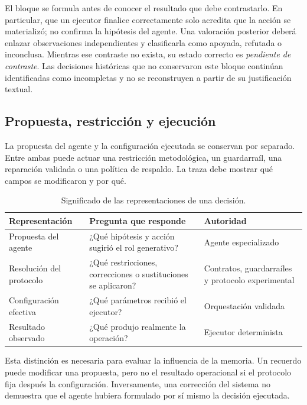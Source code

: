 El bloque se formula antes de conocer el resultado que debe contrastarlo. En
particular, que un ejecutor finalice correctamente solo acredita que la acción
se materializó; no confirma la hipótesis del agente. Una valoración posterior
deberá enlazar observaciones independientes y clasificarla como apoyada,
refutada o inconclusa. Mientras ese contraste no exista, su estado correcto es
\emph{pendiente de contraste}. Las decisiones históricas que no conservaron
este bloque continúan identificadas como incompletas y no se reconstruyen a
partir de su justificación textual.

\subsection{Propuesta, restricción y ejecución}

La propuesta del agente y la configuración ejecutada se conservan por
separado. Entre ambas puede actuar una restricción metodológica, un
guardarraíl, una reparación validada o una política de respaldo. La traza debe
mostrar qué campos se modificaron y por qué.

\begin{table}[htbp]
\centering
\caption{Significado de las representaciones de una decisión.}%
\label{tab:representaciones_decision}
\small
\begin{tabularx}{\textwidth}{>{\raggedright\arraybackslash}p{}YY}
\toprule
Representación & Pregunta que responde & Autoridad \\
\midrule
Propuesta del agente & ¿Qué hipótesis y acción sugirió el rol generativo? &
Agente especializado \\
Resolución del protocolo & ¿Qué restricciones, correcciones o sustituciones se
aplicaron? & Contratos, guardarraíles y protocolo experimental \\
Configuración efectiva & ¿Qué parámetros recibió el ejecutor? & Orquestación
validada \\
Resultado observado & ¿Qué produjo realmente la operación? & Ejecutor
determinista \\
\bottomrule
\end{tabularx}
\end{table}

Esta distinción es necesaria para evaluar la influencia de la memoria. Un
recuerdo puede modificar una propuesta, pero no el resultado operacional si el
protocolo fija después la configuración. Inversamente, una corrección del
sistema no demuestra que el agente hubiera formulado por sí mismo la decisión
ejecutada.


